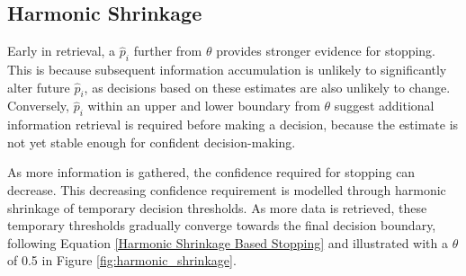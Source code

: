 \documentclass[sigconf,natbib=true,anonymous=true]{acmart}
\begin{document}

\subsection{Harmonic Shrinkage}

Early in retrieval, a $\hat{p}_i$ further from $\theta$ provides stronger evidence for stopping. This is because subsequent information accumulation is unlikely to significantly alter future $\hat{p}_i$, as decisions based on these estimates are also unlikely to change. Conversely, $\hat{p}_i$  within an upper and lower boundary from $\theta$ suggest additional information retrieval is required before making a decision, because the estimate is not yet stable enough for confident decision-making.

As more information is gathered, the confidence required for stopping can decrease. This decreasing confidence requirement is modelled through harmonic shrinkage of temporary decision thresholds. As more data is retrieved, these temporary thresholds gradually converge towards the final decision boundary, following Equation \ref{Harmonic Shrinkage Based Stopping} and illustrated with a $\theta$ of 0.5 in Figure \ref{fig:harmonic_shrinkage}.

\end{document}
